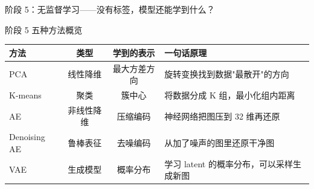 \documentclass[aspectratio=169]{ctexbeamer}
\begin{document}
\begin{frame}[shrink=22]{阶段 5：无监督学习——没有标签，模型还能学到什么？}
\vspace{0.15cm}

\begin{block}{阶段 5 五种方法概览}
\footnotesize
\centering
\begin{tabular}{l c c l}
\toprule
\textbf{方法} & \textbf{类型} & \textbf{学到的表示} & \textbf{一句话原理} \\
\midrule
PCA       & 线性降维   & 最大方差方向   & 旋转变换找到数据"最散开"的方向 \\
K-means   & 聚类       & 簇中心         & 将数据分成 K 组，最小化组内距离 \\
AE        & 非线性降维 & 压缩编码       & 神经网络把图压到 32 维再还原 \\
Denoising AE & 鲁棒表征 & 去噪编码       & 从加了噪声的图里还原干净图 \\
VAE       & 生成模型   & 概率分布       & 学习 latent 的概率分布，可以采样生成新图 \\
\bottomrule
\end{tabular}
\end{block}
\end{frame}
\end{document}
